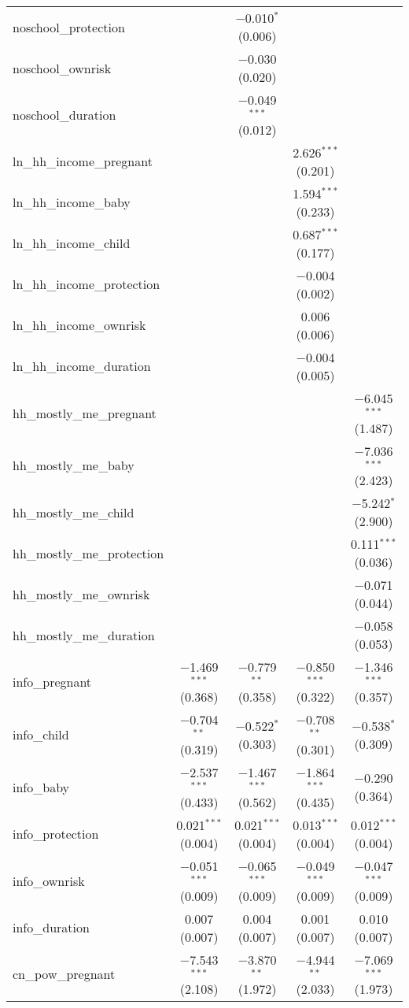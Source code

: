 \begin{table}[!htbp]
\begin{tabular}{@{\extracolsep{1pt}}lcccc}
  noschool\_protection &  & $-$0.010$^{*}$ (0.006) &  &  \\ 
  noschool\_ownrisk &  & $-$0.030 (0.020) &  &  \\ 
  noschool\_duration &  & $-$0.049$^{***}$ (0.012) &  &  \\ 
  ln\_hh\_income\_pregnant &  &  & 2.626$^{***}$ (0.201) &  \\ 
  ln\_hh\_income\_baby &  &  & 1.594$^{***}$ (0.233) &  \\ 
  ln\_hh\_income\_child &  &  & 0.687$^{***}$ (0.177) &  \\ 
  ln\_hh\_income\_protection &  &  & $-$0.004 (0.002) &  \\ 
  ln\_hh\_income\_ownrisk &  &  & 0.006 (0.006) &  \\ 
  ln\_hh\_income\_duration &  &  & $-$0.004 (0.005) &  \\ 
  hh\_mostly\_me\_pregnant &  &  &  & $-$6.045$^{***}$ (1.487) \\ 
  hh\_mostly\_me\_baby &  &  &  & $-$7.036$^{***}$ (2.423) \\ 
  hh\_mostly\_me\_child &  &  &  & $-$5.242$^{*}$ (2.900) \\ 
  hh\_mostly\_me\_protection &  &  &  & 0.111$^{***}$ (0.036) \\ 
  hh\_mostly\_me\_ownrisk &  &  &  & $-$0.071 (0.044) \\ 
  hh\_mostly\_me\_duration &  &  &  & $-$0.058 (0.053) \\ 
  info\_pregnant & $-$1.469$^{***}$ (0.368) & $-$0.779$^{**}$ (0.358) & $-$0.850$^{***}$ (0.322) & $-$1.346$^{***}$ (0.357) \\ 
  info\_child & $-$0.704$^{**}$ (0.319) & $-$0.522$^{*}$ (0.303) & $-$0.708$^{**}$ (0.301) & $-$0.538$^{*}$ (0.309) \\ 
  info\_baby & $-$2.537$^{***}$ (0.433) & $-$1.467$^{***}$ (0.562) & $-$1.864$^{***}$ (0.435) & $-$0.290 (0.364) \\ 
  info\_protection & 0.021$^{***}$ (0.004) & 0.021$^{***}$ (0.004) & 0.013$^{***}$ (0.004) & 0.012$^{***}$ (0.004) \\ 
  info\_ownrisk & $-$0.051$^{***}$ (0.009) & $-$0.065$^{***}$ (0.009) & $-$0.049$^{***}$ (0.009) & $-$0.047$^{***}$ (0.009) \\ 
  info\_duration & 0.007 (0.007) & 0.004 (0.007) & 0.001 (0.007) & 0.010 (0.007) \\ 
  cn\_pow\_pregnant & $-$7.543$^{***}$ (2.108) & $-$3.870$^{**}$ (1.972) & $-$4.944$^{**}$ (2.033) & $-$7.069$^{***}$ (1.973) \\ 

\end{tabular}
\end{table}
